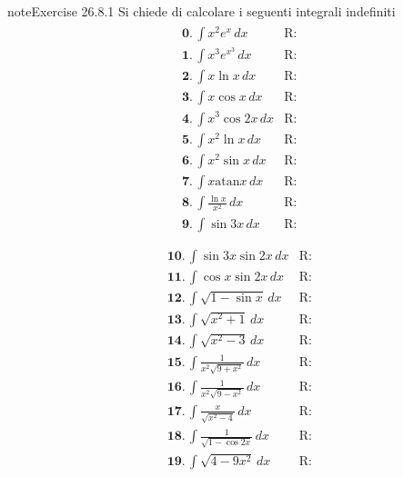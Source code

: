 \documentclass[letterpaper,10pt,italian]{jupyterBook}
\begin{document}
\begin{sphinxadmonition}{note}{Exercise 26.8.1}
\sphinxAtStartPar
Si chiede di calcolare i seguenti integrali indefiniti
\begin{equation*}
\begin{split}\begin{aligned}
 & \mathbf{0.} \,  \int x^2 e^x \, dx & \text{R: } \\
 & \mathbf{1.} \,  \int x^3 e^{x^3} \, dx & \text{R: } \\
 & \mathbf{2.} \,  \int x \ln x \, dx & \text{R: } \\
 & \mathbf{3.} \,  \int x \cos x \, dx & \text{R: } \\
 & \mathbf{4.} \,  \int x^3 \cos 2x \, dx & \text{R: } \\
 & \mathbf{5.} \,  \int x^2 \ln x \, dx & \text{R: } \\
 & \mathbf{6.} \,  \int x^2 \sin x \, dx & \text{R: } \\
 & \mathbf{7.} \,  \int x \text{atan} x \, dx & \text{R: } \\
 & \mathbf{8.} \,  \int \frac{\ln x}{x^2} \, dx & \text{R: } \\
 & \mathbf{9.} \,  \int \sin 3x \, dx & \text{R: } \\
\end{aligned}\end{split}
\end{equation*}\begin{equation*}
\begin{split}\begin{aligned}
 & \mathbf{10.} \,  \int \sin 3x \sin 2x \, dx & \text{R: } \\
 & \mathbf{11.} \,  \int \cos x \sin 2x \, dx & \text{R: } \\
 & \mathbf{12.} \,  \int \sqrt{1 - \sin x} \, dx & \text{R: } \\
 & \mathbf{13.} \,  \int \sqrt{x^2 + 1} \, dx & \text{R: } \\
 & \mathbf{14.} \,  \int \sqrt{x^2 - 3} \, dx & \text{R: } \\
 & \mathbf{15.} \,  \int \frac{1}{x^2 \sqrt{9+x^2}} \, dx & \text{R: } \\
 & \mathbf{16.} \,  \int \frac{1}{x^2 \sqrt{9-x^2}} \, dx & \text{R: } \\
 & \mathbf{17.} \,  \int \frac{x}{\sqrt{x^2-4}} \, dx & \text{R: } \\
 & \mathbf{18.} \,  \int \frac{1}{\sqrt{1 - \cos 2 x}} \, dx & \text{R: } \\
 & \mathbf{19.} \,  \int \sqrt{4 - 9 x^2} \, dx & \text{R: } \\

\end{aligned}
\end{split}
\end{equation*}
\end{sphinxadmonition}
\end{document}
